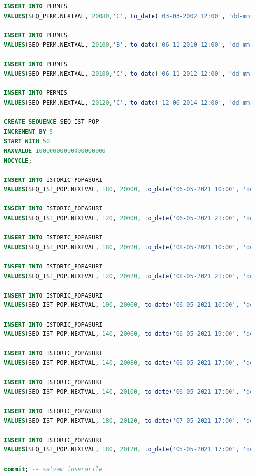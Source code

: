 \documentclass[12pt, a4paper]{article}
\begin{document}
\begin{lstlisting}[language=SQL]
INSERT INTO PERMIS
VALUES(SEQ_PERM.NEXTVAL, 20080,'C', to_date('03-03-2002 12:00', 'dd-mm-yyyy hh24:mi'));

INSERT INTO PERMIS
VALUES(SEQ_PERM.NEXTVAL, 20100,'B', to_date('06-11-2010 12:00', 'dd-mm-yyyy hh24:mi'));

INSERT INTO PERMIS
VALUES(SEQ_PERM.NEXTVAL, 20100,'C', to_date('06-11-2012 12:00', 'dd-mm-yyyy hh24:mi'));

INSERT INTO PERMIS
VALUES(SEQ_PERM.NEXTVAL, 20120,'C', to_date('12-06-2014 12:00', 'dd-mm-yyyy hh24:mi'));

CREATE SEQUENCE SEQ_IST_POP
INCREMENT BY 5
START WITH 50
MAXVALUE 10000000000000000000
NOCYCLE;

INSERT INTO ISTORIC_POPASURI
VALUES(SEQ_IST_POP.NEXTVAL, 180, 20000, to_date('06-05-2021 10:00', 'dd-mm-yyyy hh24:mi'), to_date('06-05-2021 12:00', 'dd-mm-yyyy hh24:mi'));

INSERT INTO ISTORIC_POPASURI
VALUES(SEQ_IST_POP.NEXTVAL, 120, 20000, to_date('06-05-2021 21:00', 'dd-mm-yyyy hh24:mi'), to_date('06-05-2021 21:30', 'dd-mm-yyyy hh24:mi'));

INSERT INTO ISTORIC_POPASURI
VALUES(SEQ_IST_POP.NEXTVAL, 180, 20020, to_date('08-05-2021 10:00', 'dd-mm-yyyy hh24:mi'), to_date('08-05-2021 12:00', 'dd-mm-yyyy hh24:mi'));

INSERT INTO ISTORIC_POPASURI
VALUES(SEQ_IST_POP.NEXTVAL, 120, 20020, to_date('08-05-2021 21:00', 'dd-mm-yyyy hh24:mi'), to_date('08-05-2021 21:30', 'dd-mm-yyyy hh24:mi'));

INSERT INTO ISTORIC_POPASURI
VALUES(SEQ_IST_POP.NEXTVAL, 100, 20060, to_date('06-05-2021 10:00', 'dd-mm-yyyy hh24:mi'), to_date('06-05-2021 10:20', 'dd-mm-yyyy hh24:mi'));

INSERT INTO ISTORIC_POPASURI
VALUES(SEQ_IST_POP.NEXTVAL, 140, 20060, to_date('06-05-2021 19:00', 'dd-mm-yyyy hh24:mi'), to_date('06-05-2021 19:30', 'dd-mm-yyyy hh24:mi'));

INSERT INTO ISTORIC_POPASURI
VALUES(SEQ_IST_POP.NEXTVAL, 140, 20080, to_date('06-05-2021 17:00', 'dd-mm-yyyy hh24:mi'), to_date('06-05-2021 17:30', 'dd-mm-yyyy hh24:mi'));

INSERT INTO ISTORIC_POPASURI
VALUES(SEQ_IST_POP.NEXTVAL, 140, 20100, to_date('06-05-2021 17:00', 'dd-mm-yyyy hh24:mi'), to_date('06-05-2021 17:30', 'dd-mm-yyyy hh24:mi'));

INSERT INTO ISTORIC_POPASURI
VALUES(SEQ_IST_POP.NEXTVAL, 180, 20120, to_date('07-05-2021 17:00', 'dd-mm-yyyy hh24:mi'), to_date('07-05-2021 17:30', 'dd-mm-yyyy hh24:mi'));

INSERT INTO ISTORIC_POPASURI
VALUES(SEQ_IST_POP.NEXTVAL, 180, 20120, to_date('05-05-2021 17:00', 'dd-mm-yyyy hh24:mi'), to_date('05-05-2021 17:30', 'dd-mm-yyyy hh24:mi'));

commit; -- salvam inserarile
\end{lstlisting}
\end{document}
